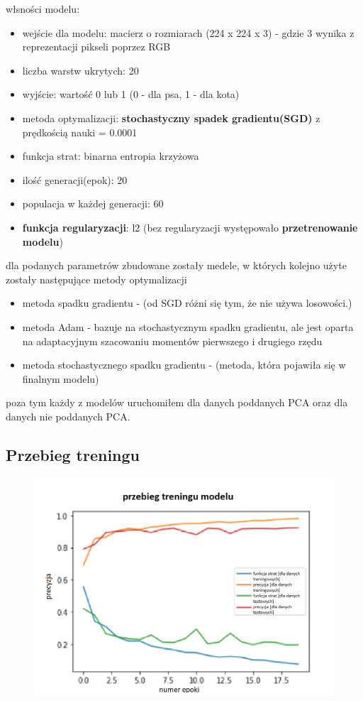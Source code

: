 \documentclass[a4paper,12pt]{scrartcl}
\begin{document}
włsności modelu:
\begin{itemize}
  \item wejście dla modelu: macierz o rozmiarach (224 x 224 x 3) - gdzie 3 wynika z reprezentacji pikseli poprzez RGB 
  \item liczba warstw ukrytych: 20 
  \item wyjście: wartość 0 lub 1 (0 - dla psa, 1 - dla kota) 
  \item metoda optymalizacji:  \textbf{stochastyczny spadek gradientu(SGD)} z prędkością nauki = 0.0001
  \item funkcja strat:  binarna entropia krzyżowa
  \item ilość generacji(epok):  20
  \item populacja w każdej generacji: 60
  \item \textbf{funkcja regularyzacji}: l2 (bez regularyzacji występowało \textbf{przetrenowanie modelu})
\end{itemize}  
dla podanych parametrów zbudowane zostały medele, w których kolejno użyte zostały następujące metody optymalizacji
\begin{itemize}
  \item metoda spadku gradientu - (od SGD różni się tym, że nie używa losowości.)
  \item metoda Adam - bazuje na stochastycznym spadku gradientu, ale jest oparta na adaptacyjnym szacowaniu momentów pierwszego i drugiego rzędu
  \item metoda stochastycznego spadku gradientu - (metoda, która pojawiła się w finalnym modelu)
\end{itemize}  
poza tym każdy z modelów uruchomiłem dla danych poddanych PCA oraz dla danych nie poddanych PCA.
\subsection{Przebieg treningu}

\begin{figure}[h]
  \includegraphics[width=\linewidth]{TRENINNG.png}
\end{figure}
\newpage{}
\end{document}
